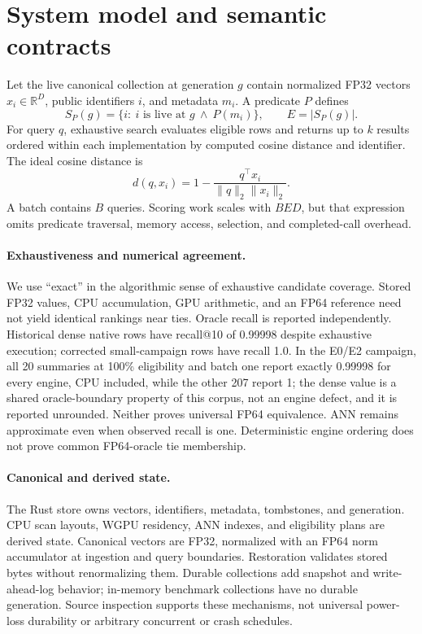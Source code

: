 \documentclass[10pt]{article}
\begin{document}
\section{System model and semantic contracts}
Let the live canonical collection at generation $g$ contain normalized FP32 vectors $x_i\in\mathbb{R}^D$, public identifiers $i$, and metadata $m_i$. A predicate $P$ defines
\begin{equation}
 S_P(g)=\{i:\ i\text{ is live at }g\ \land\ P(m_i)\},\qquad E=|S_P(g)|.
\end{equation}
For query $q$, exhaustive search evaluates eligible rows and returns up to $k$ results ordered within each implementation by computed cosine distance and identifier. The ideal cosine distance is
\begin{equation}
 d(q,x_i)=1-\frac{q^\top x_i}{\|q\|_2\|x_i\|_2}.
\end{equation}
A batch contains $B$ queries. Scoring work scales with $BED$, but that expression omits predicate traversal, memory access, selection, and completed-call overhead.

\paragraph{Exhaustiveness and numerical agreement.}
We use ``exact'' in the algorithmic sense of exhaustive candidate coverage. Stored FP32 values, CPU accumulation, GPU arithmetic, and an FP64 reference need not yield identical rankings near ties. Oracle recall is reported independently. Historical dense native rows have recall@10 of 0.99998 despite exhaustive execution; corrected small-campaign rows have recall 1.0. In the E0/E2 campaign, all 20 summaries at 100\% eligibility and batch one report exactly 0.99998 for every engine, CPU included, while the other 207 report 1; the dense value is a shared oracle-boundary property of this corpus, not an engine defect, and it is reported unrounded. Neither proves universal FP64 equivalence. ANN remains approximate even when observed recall is one. Deterministic engine ordering does not prove common FP64-oracle tie membership.

\paragraph{Canonical and derived state.}
The Rust store owns vectors, identifiers, metadata, tombstones, and generation. CPU scan layouts, WGPU residency, ANN indexes, and eligibility plans are derived state. Canonical vectors are FP32, normalized with an FP64 norm accumulator at ingestion and query boundaries. Restoration validates stored bytes without renormalizing them. Durable collections add snapshot and write-ahead-log behavior; in-memory benchmark collections have no durable generation. Source inspection supports these mechanisms, not universal power-loss durability or arbitrary concurrent or crash schedules.
\end{document}
